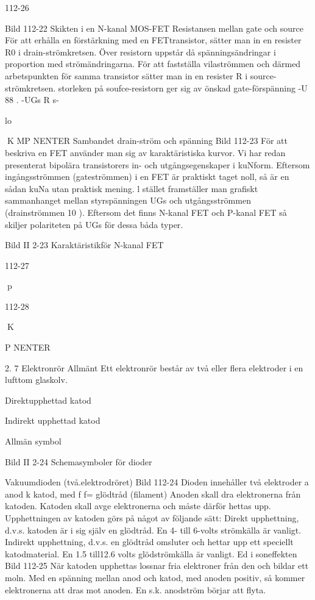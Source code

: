 {{112-26

Bild 112-22 Skikten i en N-kanal MOS-FET
Resistansen mellan gate och source
För att erhålla en förstärkning med en FETtransistor, sätter man in en resister R0 i
drain-strömkretsen. Över resistorn uppstår
då spänningsändringar i proportion med
strömändringarna.
För att fastställa vilaströmmen och därmed arbetspunkten för samma transistor
sätter man in en resister R i source-strömkretsen. storleken på soufce-resistorn ger
sig av önskad gate-förspänning -U 88 .
 -UGs
R s-

lo

K MP NENTER
Sambandet drain-ström och spänning
Bild 112-23
För att beskriva en FET använder man sig
av karaktäristiska kurvor. Vi har redan presenterat bipolära transistorers in- och utgångsegenskaper i kuNform. Eftersom ingångsströmmen (gateströmmen) i en FET
är praktiskt taget noll, så är en sådan kuNa
utan praktisk mening. l stället framställer
man grafiskt sammanhanget mellan styrspänningen UGs och utgångsströmmen (drainströmmen 10 ). Eftersom det finns N-kanal
FET och P-kanal FET så skiljer polariteten
på UGs för dessa båda typer.

Bild II 2-23 Karaktäristikför N-kanal FET

112-27

p

112-28

K

P NENTER

2. 7 Elektronrör
Allmänt
Ett elektronrör består av två eller flera elektroder i en lufttom glaskolv.

Direktupphettad
katod

Indirekt upphettad katod

Allmän
symbol

Bild II 2-24 Schemasymboler för dioder

Vakuumdioden (två.elektrodröret)
Bild 112-24
Dioden innehåller två elektroder
a anod
k katod, med f f= glödtråd (filament)
Anoden skall dra elektronerna från katoden.
Katoden skall avge elektronerna och måste
därför hettas upp.
Upphettningen av katoden görs på något
av följande sätt:
Direkt upphettning, d.v.s. katoden är i sig
själv en glödtråd. En 4- till 6-volts strömkälla
är vanligt.
Indirekt upphettning, d.v.s. en glödtråd
omsluter och hettar upp ett speciellt katodmaterial. En 1.5 till12.6 volts glödströmkälla
är vanligt.
Ed i soneffekten
Bild 112-25
När katoden upphettas lossnar fria elektroner från den och bildar ett moln. Med en
spänning mellan anod och katod, med
anoden positiv, så kommer elektronerna att
dras mot anoden. En s.k. anodström börjar
att flyta.

}}

